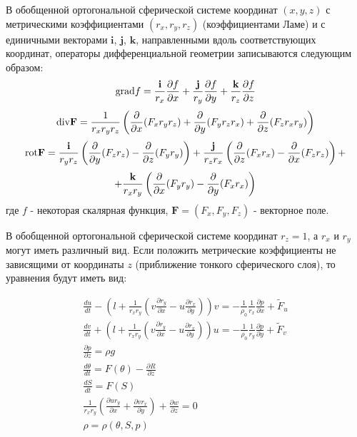 	В обобщенной ортогональной сферической системе координат $(x, y, z)$ с метрическими коэффициентами $(r_x, r_y, r_z)$ (коэффициентами Ламе) и с единичными векторами 
	$\textbf{i}$, $\textbf{j}$, $\textbf{k}$,
	направленными вдоль соответствующих координат, операторы
	дифференциальной геометрии записываются следующим образом:
	$$ \mbox{grad} f = \frac{\textbf{i}}{r_x}\frac{\partial f}{\partial x} + \frac{\textbf{j}}{r_y}\frac{\partial f}{\partial y} + \frac{\textbf{k}}{r_z}\frac{\partial f}{\partial z} $$
	$$ \mbox{div} \textbf{F} = \frac{1}{r_x r_y r_z} \left( \frac{\partial}{\partial x}(F_x r_y r_z) + \frac{\partial}{\partial y}(F_y r_z r_x) + \frac{\partial}{\partial z}(F_z r_x r_y) \right) $$
	$$ \mbox{rot} \textbf{F} = \frac{\textbf{i}}{r_y r_z} \left( \frac{\partial}{\partial y}(F_z r_z) - \frac{\partial}{\partial z}(F_y r_y) \right) + 
	\frac{\textbf{j}}{r_z r_x} \left( \frac{\partial}{\partial z}(F_x r_x) - \frac{\partial}{\partial x}(F_z r_z) \right) + $$
	$$ + \frac{\textbf{k}}{r_x r_y} \left( \frac{\partial}{\partial x}(F_y r_y) - \frac{\partial}{\partial y}(F_x r_x) \right) $$
	где $f$ - некоторая скалярная функция, $\textbf{F} = (F_x, F_y, F_z)$ - векторное поле.
	
	В обобщенной ортогональной сферической системе координат $r_z = 1$, а $r_x$ и $r_y$ могут иметь различный вид. Если положить метрические коэффициенты
	не зависящими от координаты $z$ (приближение тонкого сферического слоя), то уравнения будут иметь вид:
	
	\begin{equation} \label{eq:inmsom/2} 
	\begin{array}{c} 
	\displaystyle{ \frac{du}{dt} -\left(l+\frac{1}{r_{x} r_{y} } \left(v\frac{\partial r_{y} }{\partial x} -u\frac{\partial r_{x} }{\partial y} \right)\right)v = -\frac{1}{\rho _{0} } \frac{1}{r_{x} } \frac{\partial p}{\partial x} +\tilde{F}_{u} } \\
	
	\displaystyle{ \frac{dv}{dt} +\left(l+\frac{1}{r_{x} r_{y} } \left(v\frac{\partial r_{y} }{\partial x} -u\frac{\partial r_{x} }{\partial y} \right)\right)u = -\frac{1}{\rho _{0} } \frac{1}{r_{y} } \frac{\partial p}{\partial y} +\tilde{F}_{v} } \\ 
	
	\displaystyle{\frac{\partial p}{\partial z} =\rho g} \\ 
	
	\displaystyle{\frac{d\theta }{dt} =F(\theta )-\frac{\partial R}{\partial z} } \\ 
	
	\displaystyle{\frac{dS}{dt} =F(S)} \\ 
	
	\displaystyle{\frac{1}{r_{x} r_{y} } \left(\frac{\partial ur_{y} }{\partial x} +\frac{\partial vr_{x} }{\partial y} \right)+\frac{\partial w}{\partial z} =0} \\ 
	
	\displaystyle{\rho =\rho (\theta ,S,p)} 
	\end{array} 
	\end{equation} 
	
